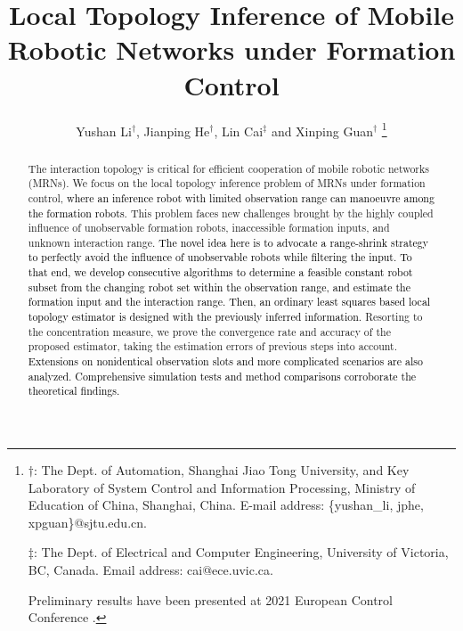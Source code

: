 \documentclass[12pt,journal,draftclsnofoot,onecolumn]{IEEEtran}
\begin{document}
\title{
Local Topology Inference of Mobile Robotic Networks under Formation Control}
\author{Yushan Li$^{\dag}$, Jianping He$^{\dag}$, Lin Cai$^{\ddag}$ and Xinping Guan$^{\dag}$
	\thanks{
	${\dag}$: The Dept. of Automation, Shanghai Jiao Tong University, and Key Laboratory of System Control and Information Processing, Ministry of Education of China, Shanghai, China. E-mail address: \{yushan\_li, jphe, xpguan\}@sjtu.edu.cn. 

	${\ddag}$: The Dept. of Electrical and Computer Engineering, University of Victoria, BC, Canada. Email address: cai@ece.uvic.ca.

	Preliminary results have been presented at 2021 European Control Conference \cite{lys}.
	}%
}

\maketitle





\begin{abstract}
The interaction topology is critical for efficient cooperation of mobile robotic networks (MRNs). 
We focus on the local topology inference problem of MRNs under formation control, 
\textcolor{black}{where an inference robot with limited observation range can manoeuvre among the formation robots. }
This problem faces new challenges brought by the highly coupled influence of unobservable formation robots, inaccessible formation inputs, and unknown interaction range. 
\textcolor{black}{The novel idea here is to advocate a range-shrink strategy to perfectly avoid the influence of unobservable robots while filtering the input. 
To that end, we develop consecutive algorithms to determine a feasible constant robot subset from the changing robot set within the observation range, and estimate the formation input and the interaction range. 
Then, an ordinary least squares based local topology estimator is designed with the previously inferred information.} 
Resorting to the concentration measure, we prove the convergence rate and accuracy of the proposed estimator, taking the estimation errors of previous steps into account. 
\textcolor{black}{Extensions on nonidentical observation slots and more complicated scenarios are also analyzed. 
Comprehensive simulation tests and method comparisons corroborate the theoretical findings.}
\end{abstract}
\end{document}
